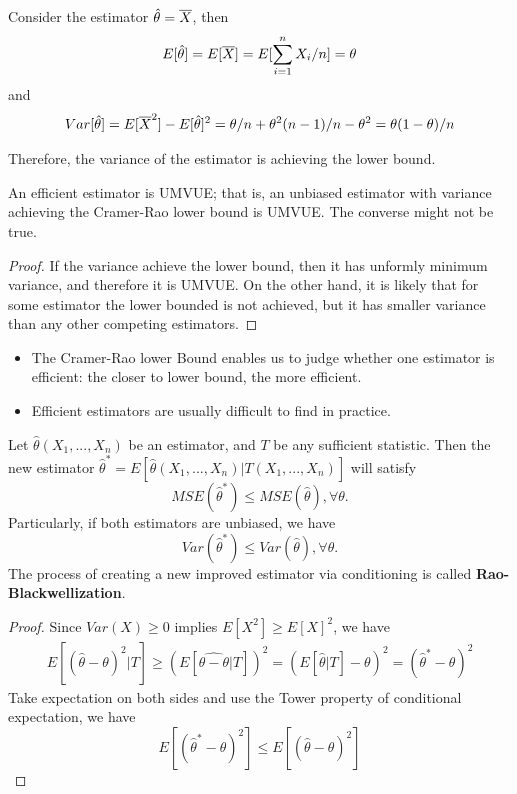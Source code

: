 \begin{refsection}
\begin{example}
	Consider the estimator $\hat{\theta} = \overline{X}$, then $$E[\hat{\theta}] = E[\overline{X}] = E[\sum_{i=1}^n X_i/n] = \theta$$
	and
	$$Var[\hat{\theta}] = E[\overline{X}^2] - E[\hat{\theta}]^2 = \theta/n + \theta^2(n-1)/n - \theta^2 = \theta(1-\theta)/n$$
	
	Therefore, the variance of the estimator is achieving the lower bound.
\end{example}

\begin{lemma}
	An efficient estimator is UMVUE; that is, an unbiased estimator with variance achieving the Cramer-Rao lower bound is UMVUE. The converse might not be true.
\end{lemma}
\begin{proof}
	If the variance achieve the lower bound, then it has unformly minimum variance, and therefore it is UMVUE. On the other hand, it is likely that for some estimator the lower bounded is not achieved, but it has smaller variance than any other competing estimators.
\end{proof}

\begin{remark}\hfill
	\begin{itemize}
		\item The Cramer-Rao lower Bound enables us to judge whether one estimator is efficient: the closer to lower bound, the more efficient.
		\item Efficient estimators are usually difficult to find in practice.
	\end{itemize}
\end{remark}



\begin{theorem}
	Let $\hat{\theta}(X_1,...,X_n)$ be an estimator, and $T$ be any sufficient statistic. Then the new estimator $\hat{\theta}^* = E[\hat{\theta}(X_1,...,X_n)|T(X_1,...,X_n)]$ will satisfy
	$$MSE(\hat{\theta}^*) \leq MSE(\hat{\theta}),\forall \theta.$$
	Particularly, if both estimators are unbiased, we have
	$$Var(\hat{\theta}^*) \leq Var(\hat{\theta}),\forall \theta .$$
	The process of creating a new improved estimator via conditioning is called \textbf{Rao-Blackwellization}.
\end{theorem}
\begin{proof}
	Since $Var(X) \geq 0$ implies $E[X^2]\geq E[X]^2$, we have
	\begin{align*}
	E[(\hat{\theta} - \theta)^2|T] \geq (E[\hat{\theta - \theta}|T])^2 = (E[\hat{\theta}|T] - \theta)^2 = (\hat{\theta}^* - \theta)^2
	\end{align*}	
	Take expectation on both sides and use the Tower property of conditional expectation, we have
	$$E[(\hat{\theta}^* - \theta)^2] \leq E[(\hat{\theta} - \theta)^2]$$
\end{proof}



\end{refsection}
